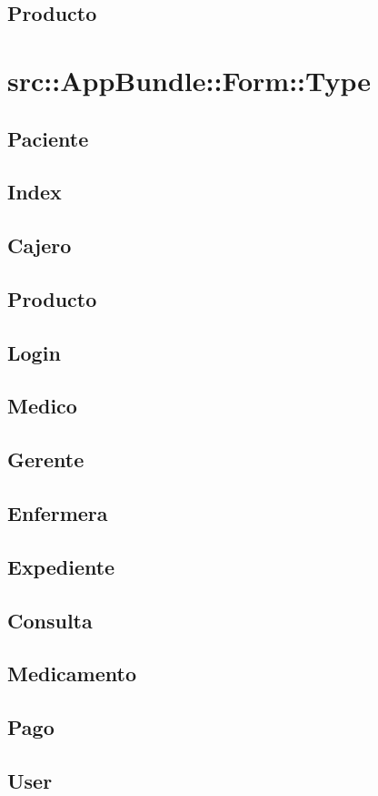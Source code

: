 		\subsection{Producto}
	\section{src::AppBundle::Form::Type}
		\subsection{Paciente}
		\subsection{Index}
		\subsection{Cajero}
		\subsection{Producto}
		\subsection{Login}
		\subsection{Medico}
		\subsection{Gerente}
		\subsection{Enfermera}
		\subsection{Expediente}
		\subsection{Consulta}
		\subsection{Medicamento}
		\subsection{Pago}
		\subsection{User}
	\newpage	
